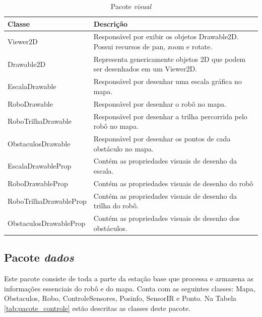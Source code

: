 \begin{table}[h]
  \centering
  \caption{Pacote \textit{visual}}
  \begin{tabular}{p{6cm}p{8cm}}
    \toprule
    \textbf{Classe} & \textbf{Descrição} \\
    \midrule
    Viewer2D & Responsável por exibir os objetos Drawable2D. Possui recursos de pan, zoom e rotate.   \\ \hline
    Drawable2D & Representa genericamente objetos 2D que podem ser desenhados em um Viewer2D. \\ \hline
    EscalaDrawable & Responsável por desenhar uma escala gráfica no mapa. \\ \hline
    RoboDrawable & Responsável por desenhar o robô no mapa. \\ \hline
    RoboTrilhaDrawable & Responsável por desenhar a trilha percorrida pelo robô no mapa. \\ \hline
    ObstaculosDrawable & Responsável por desenhar os pontos de cada obstáculo no mapa. \\
    EscalaDrawableProp & Contém as propriedades visuais de desenho da escala. \\ \hline
    RoboDrawableProp & Contém as propriedades visuais de desenho do robô \\ \hline
    RoboTrilhaDrawableProp & Contém as propriedades visuais de desenho da trilha do robô. \\ \hline
    ObstaculosDrawableProp & Contém as propriedades visuais de desenho dos obstáculos. \\ \hline
    \bottomrule
  \end{tabular}%
  \label{tab:pacote_visual}%
\end{table}%

\subsection{Pacote \textit{dados}}

Este pacote consiste de toda a parte da estação base que processa e armazena as informações essenciais do robô e do mapa. Conta com as seguintes classes: Mapa, Obstaculos, Robo, ControleSensores, Posinfo, SensorIR e Ponto. Na Tabela \ref{tab:pacote_controle} estão descritas as classes deste pacote.

